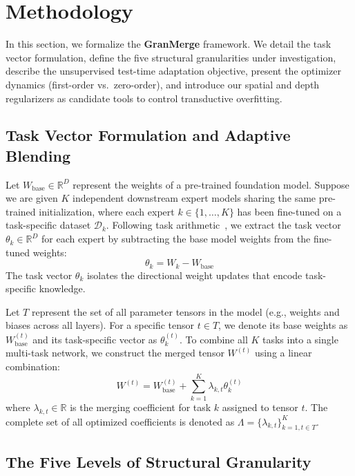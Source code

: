 \section{Methodology}
\label{sec:method}

In this section, we formalize the \textbf{GranMerge} framework. 
We detail the task vector formulation, define the five structural granularities under investigation, describe the unsupervised test-time adaptation objective, present the optimizer dynamics (first-order vs.\ zero-order), and introduce our spatial and depth regularizers as candidate tools to control transductive overfitting.

\subsection{Task Vector Formulation and Adaptive Blending}

Let $W_{\text{base}} \in \mathbb{R}^D$ represent the weights of a pre-trained foundation model. 
Suppose we are given $K$ independent downstream expert models sharing the same pre-trained initialization, where each expert $k \in \{1, \dots, K\}$ has been fine-tuned on a task-specific dataset $\mathcal{D}_k$. 
Following task arithmetic~\cite{ilharco2022task}, we extract the task vector $\theta_k \in \mathbb{R}^D$ for each expert by subtracting the base model weights from the fine-tuned weights:
\begin{equation}
\theta_k = W_k - W_{\text{base}}
\end{equation}
The task vector $\theta_k$ isolates the directional weight updates that encode task-specific knowledge. 

Let $T$ represent the set of all parameter tensors in the model (e.g., weights and biases across all layers). 
For a specific tensor $t \in T$, we denote its base weights as $W_{\text{base}}^{(t)}$ and its task-specific vector as $\theta_k^{(t)}$. 
To combine all $K$ tasks into a single multi-task network, we construct the merged tensor $W^{(t)}$ using a linear combination:
\begin{equation}
\label{eq:merge}
W^{(t)} = W_{\text{base}}^{(t)} + \sum_{k=1}^K \lambda_{k, t} \theta_k^{(t)}
\end{equation}
where $\lambda_{k, t} \in \mathbb{R}$ is the merging coefficient for task $k$ assigned to tensor $t$. 
The complete set of all optimized coefficients is denoted as $\Lambda = \{\lambda_{k, t}\}_{k=1, t \in T}^K$.

\subsection{The Five Levels of Structural Granularity}

